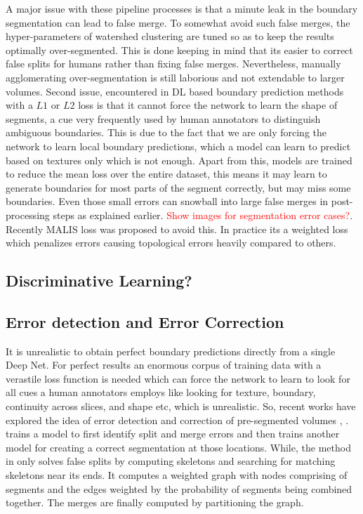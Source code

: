 A major issue with these pipeline processes is that a minute leak in the boundary segmentation can lead to false merge. To somewhat avoid such false merges, the hyper-parameters of watershed clustering are tuned so as to keep the results optimally over-segmented. This is done keeping in mind that its easier to correct false splits for humans rather than fixing false merges. Nevertheless, manually agglomerating over-segmentation is still laborious and not extendable to larger volumes.
Second issue, encountered in DL based boundary prediction methods with a $L1$ or $L2$ loss is that it cannot force the network to learn the shape of segments, a cue very frequently used by human annotators to distinguish ambiguous boundaries. This is due to the fact that we are only forcing the network to learn local boundary predictions, which a model can learn to predict based on textures only which is not enough.
Apart from this, models are trained to reduce the mean loss over the entire dataset, this means it may learn to generate boundaries for most parts of the segment correctly, but may miss some boundaries. Even those small errors can snowball into large false merges in post-processing steps as explained earlier. \textcolor{red}{Show images for segmentation error cases?}. Recently MALIS loss was proposed to avoid this. In practice its a weighted loss which penalizes errors causing topological errors heavily compared to others.


\subsection{Discriminative Learning?}

\subsection{Error detection and Error Correction}
It is unrealistic to obtain perfect boundary predictions directly from a single Deep Net. For perfect results an enormous corpus of training data with a verastile loss function is needed which can force the network to learn to look for all cues a human annotators employs like looking for texture, boundary, continuity across slices, and shape etc, which is unrealistic. So, recent works have explored the idea of error detection and correction of pre-segmented volumes \cite{Seung2017}, \cite{Brain2019}. \cite{Seung2017} trains a model to first identify split and merge errors and then trains another model for creating a correct segmentation at those locations. While, the method in \cite{Brain2019} only solves false splits by computing skeletons and searching for matching skeletons near its ends. It computes a weighted graph with nodes comprising of segments and the edges weighted by the probability of segments being combined together. The merges are finally computed by partitioning the graph.


